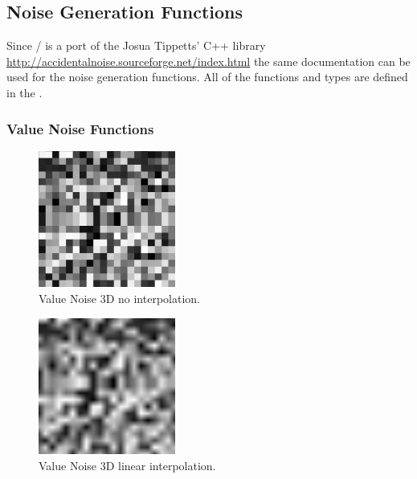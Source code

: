\subsection{Noise Generation Functions}

Since \ANLOpenCL/ is a port of the Josua Tippetts' C++ library
\url{http://accidentalnoise.sourceforge.net/index.html} the same documentation
can be used for the noise generation functions.
All of the functions and types are defined in the .

\subsubsection{Value Noise Functions}

\begin{figure}[h]
\centering
\includegraphics[width=0.4\textwidth]{out/noise_functions/value_noise3D_noInterp.png}
\caption{Value Noise 3D no interpolation.}
\label{fig:value_noise3D_noInterp}
\end{figure}

\begin{figure}[h]
\centering
\includegraphics[width=0.4\textwidth]{out/noise_functions/value_noise3D_linearInterp.png}
\caption{Value Noise 3D linear interpolation.}
\label{fig:value_noise3D_linearInterp}
\end{figure}

